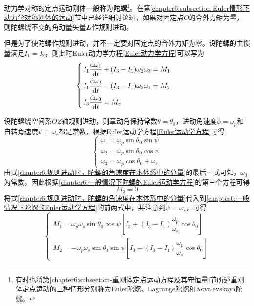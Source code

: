 动力学对称的定点运动刚体一般称为{\bf 陀螺}\footnote{有时也将第\ref{chapter6:subsection-重刚体定点运动方程及其守恒量}节所述重刚体定点运动的三种情形分别称为Euler陀螺、Lagrange陀螺和Kovalevskaya陀螺。}。在第\ref{chapter6:subsection-Euler情形下动力学对称刚体的运动}节中已经详细讨论过，如果对固定点$O$的合外力矩为零，则陀螺绕不变的角动量矢量$\boldsymbol{L}$作规则进动。

但是为了使陀螺作规则进动，并不一定要对固定点的合外力矩为零。设陀螺的主惯量满足$I_1=I_2$，则此时Euler动力学方程\eqref{Euler动力学方程}可以写为
\begin{equation}
\begin{cases}
	I_1\dfrac{\mathrm{d} \omega_1}{\mathrm{d} t}+(I_3-I_1)\omega_2\omega_3=M_1 \\[1.5ex]
	I_1\dfrac{\mathrm{d} \omega_2}{\mathrm{d} t}-(I_3-I_1)\omega_3\omega_1=M_2 \\[1.5ex]
	I_3\dfrac{\mathrm{d} \omega_3}{\mathrm{d} t}=M_z
\end{cases}
\label{chapter6:一般情况下陀螺的Euler运动学方程}
\end{equation}

设陀螺绕空间系$OZ$轴规则进动，则章动角保持常数$\theta=\theta_0$，进动角速度$\dot{\phi}=\omega_p$和自转角速度$\dot{\psi}=\omega_s$都是常数，根据Euler运动学方程\eqref{Euler运动学方程}可得
\begin{equation}
\begin{cases}
	\omega_1=\omega_p\sin\theta_0\sin\psi \\
	\omega_2=\omega_p\sin\theta_0\cos\psi \\
	\omega_3=\omega_p\cos\theta_0+\omega_s
\end{cases}
\label{chapter6:规则进动时，陀螺的角速度在本体系中的分量}
\end{equation}
由式\eqref{chapter6:规则进动时，陀螺的角速度在本体系中的分量}的最后一式可知，$\omega_3$为常数，因此根据\eqref{chapter6:一般情况下陀螺的Euler运动学方程}的第三个方程可得
\begin{equation}
	M_3=0
	\label{chapter6:规则进动时，陀螺所受合外力矩的z分量}
\end{equation}
将式\eqref{chapter6:规则进动时，陀螺的角速度在本体系中的分量}代入到\eqref{chapter6:一般情况下陀螺的Euler运动学方程}的前两式中，并注意到$\dot{\psi}=\omega_s$，可得
\begin{equation}
\begin{cases}
	M_1=\omega_p\omega_s\sin\theta_0\cos\psi\left[I_3+(I_3-I_1)\dfrac{\omega_p}{\omega_s}\cos\theta_0\right] \\[1.5ex]
	M_2=-\omega_p\omega_s\sin\theta_0\sin\psi\left[I_3+(I_3-I_1)\dfrac{\omega_p}{\omega_s}\cos\theta_0\right]
\end{cases}
\label{chapter6:规则进动时，陀螺所受合外力矩的x和y分量}
\end{equation}

